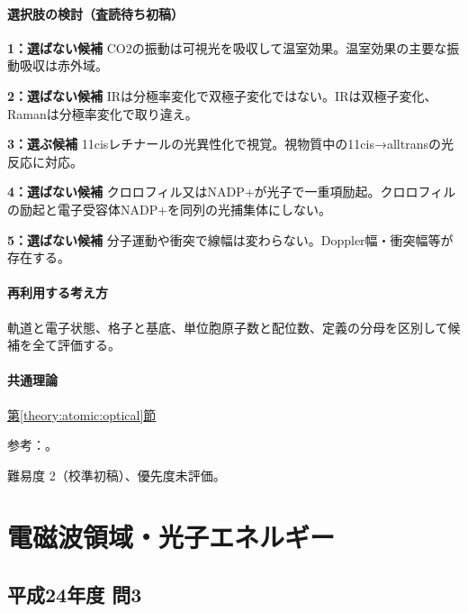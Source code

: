 \paragraph{選択肢の検討（査読待ち初稿）}\mbox{}\par

\noindent\textbf{1：選ばない候補} CO2の振動は可視光を吸収して温室効果。温室効果の主要な振動吸収は赤外域。\par

\noindent\textbf{2：選ばない候補} IRは分極率変化で双極子変化ではない。IRは双極子変化、Ramanは分極率変化で取り違え。\par

\noindent\textbf{3：選ぶ候補} 11cisレチナールの光異性化で視覚。視物質中の11cis→alltransの光反応に対応。\par

\noindent\textbf{4：選ばない候補} クロロフィル又はNADP+が光子で一重項励起。クロロフィルの励起と電子受容体NADP+を同列の光捕集体にしない。\par

\noindent\textbf{5：選ばない候補} 分子運動や衝突で線幅は変わらない。Doppler幅・衝突幅等が存在する。\par

\paragraph{再利用する考え方} 軌道と電子状態、格子と基底、単位胞原子数と配位数、定義の分母を区別して候補を全て評価する。

\paragraph{共通理論} \hyperref[theory:atomic:optical]{第\ref*{theory:atomic:optical}節}

\par 参考：\cite{atomic_retinal,atomic_ir_raman,atomic_linewidth,atomic_photosynthesis,atomic_ir_co2}。

\par 難易度 2（校準初稿）、優先度未評価。

\section{電磁波領域・光子エネルギー}

\subsection{平成24年度 問3}
\label{q:h24-reg-applied-03}

